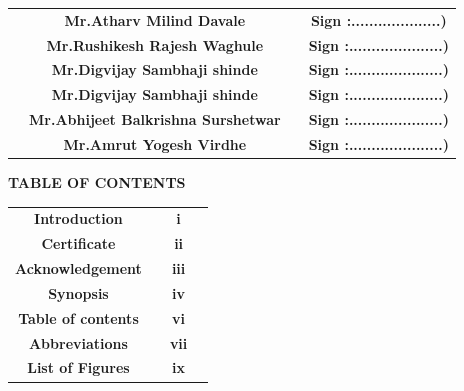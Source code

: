 \documentclass[12pt]{article}
\begin{document}
   
 \begin{tabular}{ c c c c } 
  \hspace{1.1in}&\textbf{Mr.Atharv Milind Davale} & \hspace{0.5in}  & \textbf{ Sign :....................)} \\ [1mm] 
  \hspace{1.1in} &\textbf {Mr.Rushikesh Rajesh Waghule}& \hspace{0.5in}   & \textbf{Sign :.....................) }\\[1mm]
  \hspace{1.1in}  &\textbf{ Mr.Digvijay Sambhaji shinde } & \hspace{0.5in}  & \textbf{Sign :.....................) }\\[1mm]
  \hspace{1.1in}  &\textbf{ Mr.Digvijay Sambhaji shinde } & \hspace{0.5in}  & \textbf{Sign :.....................) }\\[1mm]
  \hspace{1.1in}  &\textbf{ Mr.Abhijeet Balkrishna Surshetwar} & \hspace{0.5in}  & \textbf{Sign :.....................) }\\[1mm]
  \hspace{1.1in}  &\textbf{ Mr.Amrut Yogesh Virdhe } & \hspace{0.5in}  & \textbf{Sign :.....................) }\\[7mm]
 \end{tabular}   


\clearpage


\begin{center}
 \Large \textbf {TABLE OF CONTENTS }\\[15mm]
 \end{center}


\begin{tabular}{ c c c c } 
  \textbf{Introduction} & \hspace{3.5in}  & \textbf{i} \\ [5mm] 
  \textbf{Certificate} & \hspace{3.5in}  & \textbf{ii} \\ [5mm]
  \textbf{Acknowledgement} & \hspace{2.5in}  & \textbf{iii} \\ [5mm] 
  \textbf{Synopsis} & \hspace{2.5in}  & \textbf{iv} \\ [5mm] 
  \textbf{Table of contents} & \hspace{2.5in}  & \textbf{vi} \\ [5mm] 
  \textbf{Abbreviations} & \hspace{2.5in}  & \textbf{vii} \\ [5mm] 
  \textbf{List of Figures} & \hspace{2.5in}  & \textbf{ix} \\ [5mm]  
 \end{tabular}  
\end{document}

